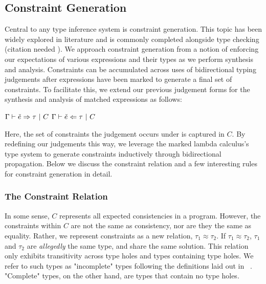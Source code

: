 \subsection{Constraint Generation}
Central to any type inference system is constraint generation. This topic has been widely explored in literature and is commonly completed alongside type checking (citation needed ). We approach constraint generation from a notion of enforcing our expectations of various expressions and their types as we perform synthesis and analysis. Constraints can be accumulated across uses of bidirectional typing judgements after expressions have been marked to generate a final set of constraints. To facilitate this, we extend our previous judgement forms for the synthesis and analysis of matched expressions as follows:
\begin{center}
    $\Gamma \vdash \check{e} \Rightarrow \tau ~|~ C$ \hspace{3cm} $\Gamma \vdash \check{e} \Leftarrow \tau ~|~ C$
\end{center}
Here, the set of constraints the judgement occurs under is captured in $C$. By redefining our judgements this way, we leverage the marked lambda calculus's type system to generate constraints inductively through bidirectional propagation. Below we discuss the constraint relation and a few interesting rules for constraint generation in detail.

\subsubsection{The Constraint Relation}
In some sense, $C$ represents all expected consistencies in a program. However, the constraints within $C$ are not the same as consistency, nor are they the same as equality. Rather, we represent constraints as a new relation, $\tau_1 \approx \tau_2$. If $\tau_1 \approx \tau_2$, $\tau_1$ and $\tau_2$ are \textit{allegedly} the same type, and share the same solution. This relation only exhibits transitivity across type holes and types containing type holes. We refer to such types as "incomplete" types following the definitions laid out in ~\cite{HazelnutPOPL}. "Complete" types, on the other hand, are types that contain no type holes. 

